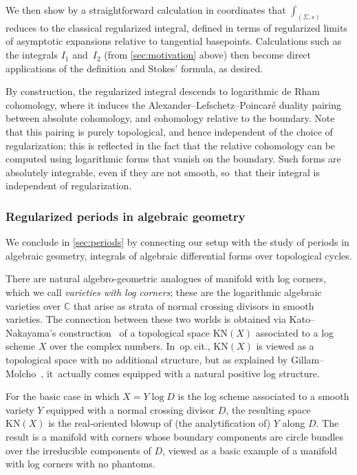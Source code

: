 \documentclass[10pt]{amsart}
\theoremstyle{definition}
\theoremstyle{remark}
\let\defn\emph
\newcommand{\CC}{\mathbb{C}}
\newcommand{\Sig}{\Sigma}
\newcommand{\KN}[1]{\mathrm{KN}(#1)}
\begin{document}
We then show by a straightforward calculation in coordinates that $\int_{(\Sig,s)}$ reduces to the classical regularized integral, defined in terms of regularized limits of asymptotic expansions relative to tangential basepoints. Calculations such as the integrals $I_1$ and~$I_2$ (from \autoref{sec:motivation} above) then become direct applications of the definition and Stokes' formula, as desired.

By construction, the regularized integral descends to logarithmic de Rham cohomology, where it induces the Alexander--Lefschetz--Poincaré duality pairing between absolute cohomology, and cohomology relative to the boundary. Note that this pairing is purely topological, and hence independent of the choice of regularization; this is reflected in the fact that the relative cohomology can be computed using logarithmic forms that vanish on the boundary. Such forms are absolutely integrable, even if they are not smooth, so~that their integral is independent of regularization.

\subsubsection{Regularized periods in algebraic geometry}

We conclude in \autoref{sec:periods} by connecting our setup with the study of periods in algebraic geometry, \ie integrals of algebraic differential forms over topological cycles.

There are natural algebro-geometric analogues of manifold with log corners, which we call \defn{varieties with log corners}; these are the logarithmic algebraic varieties over $\CC$ that arise as strata of normal crossing divisors in smooth varieties. The connection between these two worlds is obtained via Kato--Nakayama's construction~\cite{KatoNakayama} of a topological space $\KN{X}$ associated to a log scheme $X$ over the complex numbers. In~{op.\,cit.}, $\KN{X}$ is viewed as a topological space with no additional structure, but as explained by Gillam--Molcho~\cite{GillamMolcho}, it~actually comes equipped with a natural positive log structure.

For the basic case in which $X = Y \log D$ is the log scheme associated to a smooth variety $Y$ equipped with a normal crossing divisor $D$, the resulting space $\KN{X}$ is the real-oriented blowup of (the analytification of) $Y$ along $D$. The result is a manifold with corners whose boundary components are circle bundles over the irreducible components of $D$, viewed as a basic example of a manifold with log corners with no phantoms.
\end{document}

